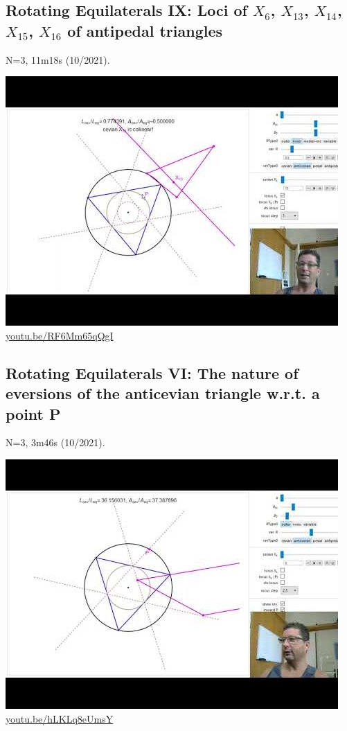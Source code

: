\documentclass[12pt]{amsart}
\begin{document}
\subsection{Rotating Equilaterals IX: Loci of $X_{6}$, $X_{13}$, $X_{14}$, $X_{15}$, $X_{16}$ of antipedal triangles}
\label{vid:RF6Mm65qQgI}
\noindent N=3, 11m18s (10/2021). 
\begin{center}\includegraphics[width=.5\textwidth]{pics/RF6Mm65qQgI.jpg} \\ 
\href{https://youtu.be/RF6Mm65qQgI}{\url{youtu.be/RF6Mm65qQgI}}\end{center}
% 

\subsection{Rotating Equilaterals VI: The nature of eversions of the anticevian triangle w.r.t. a point P}
\label{vid:hLKLq8eUmsY}
\noindent N=3, 3m46s (10/2021). 
\begin{center}\includegraphics[width=.5\textwidth]{pics/hLKLq8eUmsY.jpg} \\ 
\href{https://youtu.be/hLKLq8eUmsY}{\url{youtu.be/hLKLq8eUmsY}}\end{center}
% 
\end{document}
